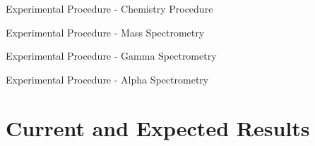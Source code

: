 \documentclass{beamer}
\begin{document}
\begin{frame}{Experimental Procedure - Chemistry Procedure}

\end{frame}

\begin{frame}{Experimental Procedure - Mass Spectrometry}

\end{frame}

\begin{frame}{Experimental Procedure - Gamma Spectrometry}

\end{frame}

\begin{frame}{Experimental Procedure - Alpha Spectrometry}

\end{frame}



\section{Current and Expected Results}
\begin{frame}
  \sectionpage
\end{frame}
\end{document}
